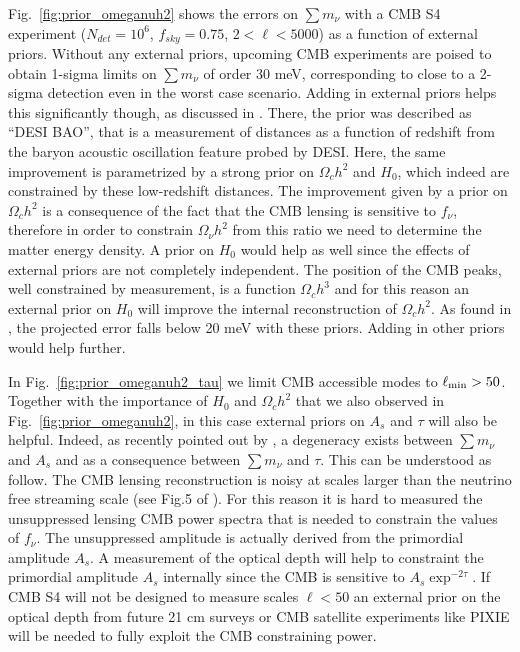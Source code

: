 \documentclass[aps,prd,reprint,superscriptaddress]{revtex4-1}
\newcommand{\reffig}[1]{Fig.~\ref{fig:#1}}
\begin{document}
\reffig{prior_omeganuh2} shows the errors on $\sum m_\nu$ with a CMB S4 experiment ($N_{det}=10^{6}$, $f_{sky}=0.75$,  $2<\ell<5000$) as a function of external priors.
Without any external priors, upcoming CMB experiments are poised to obtain 1-sigma limits on $\sum m_\nu$ of order 30 meV, corresponding to close to a 2-sigma detection even in the worst case scenario. Adding in external priors helps this significantly though, as discussed in \cite{2013arXiv1309.5383A,pan:2015,allison:2015}. 
There, the prior was described as ``DESI BAO'', that is a measurement of distances as a function of redshift from the baryon acoustic oscillation feature probed by DESI. Here, the same improvement is parametrized by a strong prior on $\Omega_ch^2$ and $H_{0}$, which indeed are constrained by these low-redshift distances.
The improvement given by a prior on $\Omega_ch^2$ is a consequence of the fact that the CMB lensing is sensitive to $f_\nu$, therefore in order to constrain $\Omega_{\nu}h^2$ from this ratio we need to determine the matter energy density. 
A prior on  $H_{0}$ would help as well since the effects of external priors are not completely independent.
The position of the CMB peaks, well constrained by measurement, is a function $\Omega_ch^3$ and for this reason an external prior on $H_{0}$ will improve the internal reconstruction of $\Omega_ch^2$.
As found in \cite{2013arXiv1309.5383A}, the projected error falls below 20 meV with these priors. Adding in other priors would help further.

In \reffig{prior_omeganuh2_tau} we limit CMB accessible modes to $\ell_{\rm min}>50$. 
Together with the importance of $H_{0}$ and $\Omega_ch^2$ that we also observed in \reffig{prior_omeganuh2}, in this case external priors on $A_{s}$ and $\tau$ will also be helpful.
Indeed, as recently pointed out by \cite{allison:2015}, a degeneracy exists between $\sum m_\nu$ and $A_{s}$ and as a consequence between $\sum m_\nu$ and $\tau$. This can be understood as follow.
The CMB lensing reconstruction is noisy at scales larger than the neutrino free streaming scale (see Fig.5 of \cite{2013arXiv1309.5383A}). For this reason it is hard to measured the unsuppressed lensing CMB power spectra that is needed to constrain the values of $f_{\nu}$. The unsuppressed amplitude is actually derived from the primordial amplitude $A_{s}$.
A measurement of the optical depth will help to constraint the primordial amplitude $A_{s}$ internally since the CMB is sensitive to $A_{s}\exp^{-2\tau}$. If CMB S4 will not be designed to measure scales $\ell<50$ an external prior on the optical depth from future 21 cm surveys \cite{liu:2015} or CMB satellite experiments like PIXIE \cite{kogut:2011} will be needed to fully exploit the CMB constraining power.
\end{document}

